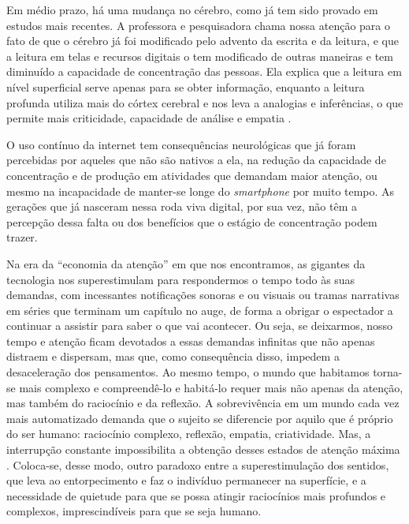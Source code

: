Em médio prazo, há uma mudança no cérebro, como já tem sido provado em estudos mais recentes. A professora e pesquisadora \textcite{wolf2019} chama nossa atenção para o fato de que o cérebro já foi modificado pelo advento da escrita e da leitura, e que a leitura em telas e recursos digitais o tem modificado de outras maneiras e tem diminuído a capacidade de concentração das pessoas. Ela explica que a leitura em nível superficial serve apenas para se obter informação, enquanto a leitura profunda utiliza mais do córtex cerebral e nos leva a analogias e inferências, o que permite mais criticidade, capacidade de análise e empatia \cite[Wolf em entrevista à BBC]{bbc2021}.

O uso contínuo da internet tem consequências neurológicas que já foram percebidas por aqueles que não são nativos a ela, na redução da capacidade de concentração e de produção em atividades que demandam maior atenção, ou mesmo na incapacidade de manter-se longe do \textit{smartphone} por muito tempo. As gerações que já nasceram nessa roda viva digital, por sua vez, não têm a percepção dessa falta ou dos benefícios que o estágio de concentração podem trazer.

Na era da “economia da atenção” em que nos encontramos, as gigantes da tecnologia nos superestimulam para respondermos o tempo todo às suas demandas, com incessantes notificações sonoras e ou visuais ou tramas narrativas em séries que terminam um capítulo no auge, de forma a obrigar o espectador a continuar a assistir para saber o que vai acontecer. Ou seja, se deixarmos, nosso tempo e atenção ficam devotados a essas demandas infinitas que não apenas distraem e dispersam, mas que, como consequência disso, impedem a desaceleração dos pensamentos. Ao mesmo tempo, o mundo que habitamos torna-se mais complexo e compreendê-lo e habitá-lo requer mais não apenas da atenção, mas também do raciocínio e da reflexão. A sobrevivência em um mundo cada vez mais automatizado demanda que o sujeito se diferencie por aquilo que é próprio do ser humano: raciocínio complexo, reflexão, empatia, criatividade. Mas, a interrupção constante impossibilita a obtenção desses estados de atenção máxima \cite{wolf2019}. Coloca-se, desse modo, outro paradoxo entre a superestimulação dos sentidos, que leva ao entorpecimento e faz o indivíduo permanecer na superfície, e a necessidade de quietude para que se possa atingir raciocínios mais profundos e complexos, imprescindíveis para que se seja humano. 


